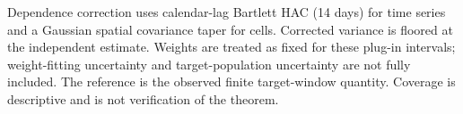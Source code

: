 \documentclass[10pt]{article}
\begin{document}
\medskip\noindent Dependence correction uses calendar-lag Bartlett HAC (14 days) for time series and a Gaussian spatial covariance taper for cells.
Corrected variance is floored at the independent estimate. Weights are treated as fixed for these plug-in intervals;
weight-fitting uncertainty and target-population uncertainty are not fully included.
The reference is the observed finite target-window quantity. Coverage is descriptive and is not verification of the theorem.
\end{document}
